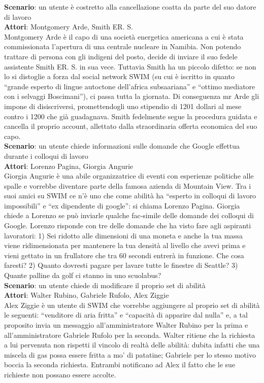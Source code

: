 \documentclass[a4paper,12pt]{article}
\begin{document}
\textbf{Scenario}: un utente è costretto alla cancellazione coatta da parte del suo datore di lavoro \\
\textbf{Attori}: Montgomery Arde, Smith ER. S. \\
Montgomery Arde è il capo di una società energetica americana a cui è stata commissionata l'apertura di una centrale nucleare in Namibia. Non potendo trattare di persona con gli indigeni del posto, decide di inviare il suo fedele assistente Smith ER. S. in sua vece. Tuttavia Smith ha un piccolo difetto: se non lo si distoglie a forza dal social network SWIM (su cui è iscritto in quanto “grande esperto di lingue autoctone dell'africa subsaariana” e “ottimo mediatore con i selvaggi Boscimani”), ci passa tutta la giornata. Di conseguenza mr Arde gli impone di disiscriversi, promettendogli uno stipendio di 1201 dollari al mese contro i 1200 che già guadagnava. Smith fedelmente segue la procedura guidata e cancella il proprio account, allettato dalla straordinaria offerta economica del suo capo. \\[1em]
\textbf{Scenario}: un utente chiede informazioni sulle domande che Google effettua durante i colloqui di lavoro \\
\textbf{Attori}: Lorenzo Pagina, Giorgia Angurie \\
Giorgia Angurie è una abile organizzatrice di eventi con esperienze politiche alle spalle e vorrebbe diventare parte della famosa azienda di Mountain View. Tra i suoi amici su SWIM ce n'è uno che come abilità ha “esperto in colloqui di lavoro impossibili” e “ex dipendente di google”: si chiama Lorenzo Pagina. Giorgia chiede a Lorenzo se può inviarle qualche fac-simile delle domande dei colloqui di Google. Lorenzo risponde con tre delle domande che ha visto fare agli aspiranti lavoratori: 1) Sei ridotto alle dimensioni di una moneta e anche la tua massa viene ridimensionata per mantenere la tua densità al livello che avevi prima e vieni gettato in un frullatore che tra 60 secondi entrerà in funzione. Che cosa faresti?  2) Quanto dovresti pagare per lavare tutte le finestre di Seattle?  3) Quante palline da golf ci stanno in uno scuolabus? \\[1em]
\textbf{Scenario}: un utente chiede di modificare il proprio set di abilità \\
\textbf{Attori}: Walter Rubino, Gabriele Rufolo, Alex Ziggie \\
Alex Ziggie è un utente di SWIM che vorrebbe aggiungere al proprio set di abilità le seguenti: “venditore di aria fritta” e “capacità di apparire dal nulla” e, a tal proposito invia un messaggio all'amministratore Walter Rubino per la prima e all'amministratore Gabriele Rufolo per la seconda. Walter ritiene che la richiesta a lui pervenuta non rispetti il vincolo di realtà delle abilità: dubita infatti che una miscela di gas possa essere fritta a mo' di patatine; Gabriele per lo stesso motivo boccia la seconda richiesta. Entrambi notificano ad Alex il fatto che le sue richieste non possano essere accolte.
\end{document}
